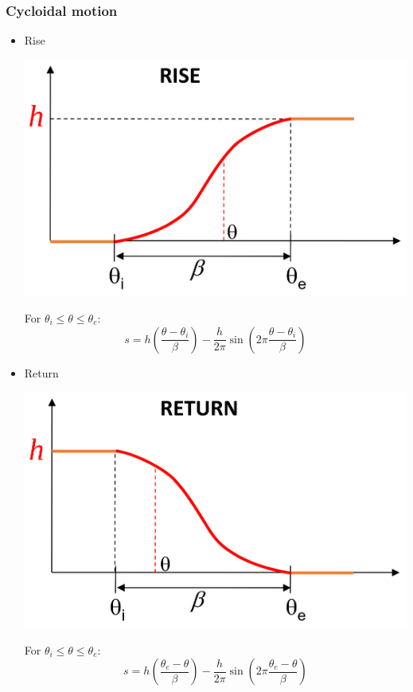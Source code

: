\documentclass[11pt]{article}
\begin{document}
\subsubsection{Cycloidal motion}
\label{sec:org324a841}
\begin{itemize}
\item Rise
\begin{center}
\includegraphics[width=.9\linewidth]{./images/formula-method-cycloidal-motion-rise-graph.png}
\end{center}

For \(\theta_i \le \theta \le \theta_e\):
\[s = h \left(\frac{\theta - \theta_i}{\beta} \right) - \frac{h}{2 \pi} \sin \left( 2 \pi \frac{\theta - \theta_i}{\beta} \right)\]

\item Return
\begin{center}
\includegraphics[width=.9\linewidth]{./images/formula-method-cycloidal-motion-return-graph.png}
\end{center}

For \(\theta_i \le \theta \le \theta_e\):
\[s = h \left(\frac{\theta_e - \theta}{\beta} \right) - \frac{h}{2 \pi} \sin \left( 2 \pi \frac{\theta_e - \theta}{\beta} \right)\]
\end{itemize}
\end{document}
